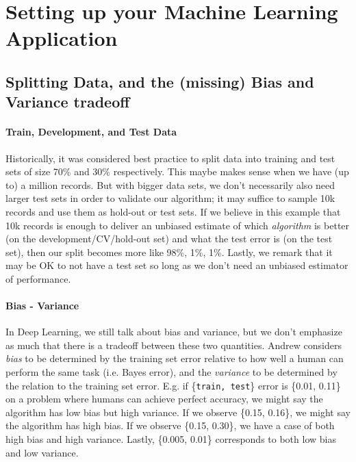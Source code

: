 \documentclass[12pt]{article}
\begin{document}
\section{Setting up your Machine Learning Application}
\subsection{Splitting Data, and the (missing) Bias and Variance tradeoff}
\paragraph{Train, Development, and Test Data}
Historically, it was considered best practice to split data into training and test sets of size 70\% and 30\% respectively. This maybe makes sense when we have (up to) a million records. But with bigger data sets, we don't necessarily also need larger test sets in order to validate our algorithm; it may suffice to sample 10k records and use them as hold-out or test sets. If we believe in this example that 10k records is enough to deliver an unbiased estimate of which \emph{algorithm} is better (on the development/CV/hold-out set) and what the test error is (on the test set), then our split becomes more like 98\%, 1\%, 1\%. Lastly, we remark that it may be OK to not have a test set so long as we don't need an unbiased estimator of performance.
\vspace{-.5ex}
\paragraph{Bias - Variance} In Deep Learning, we still talk about bias and variance, but we don't emphasize as much that there is a tradeoff between these two quantities. Andrew considers \emph{bias} to be determined by the training set error relative to how well a human can perform the same task (i.e. Bayes error), and the \emph{variance} to be determined by the relation to the training set error. 
E.g. if \{\texttt{train, test}\} error is \{0.01, 0.11\} on a problem where humans can achieve perfect accuracy, we might say the algorithm has low bias but high variance. If we observe \{0.15, 0.16\}, we might say the algorithm has high bias. If we observe \{0.15, 0.30\}, we have a case of both high bias and high variance. Lastly, \{0.005, 0.01\} corresponds to both low bias and low variance.
\end{document}
